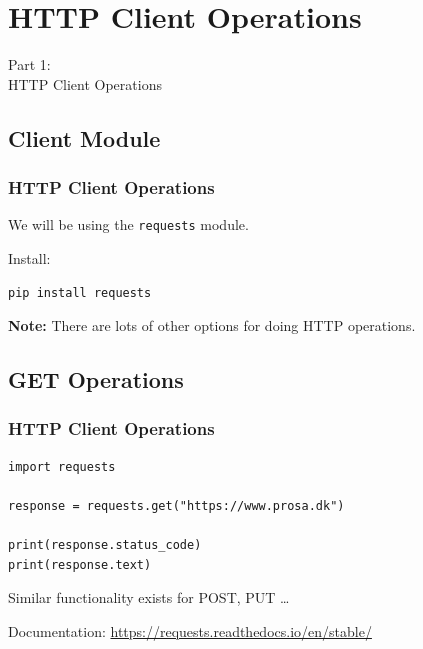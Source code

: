 \definecolor{http}{rgb}{\componentA, \componentB, \componentC}
\definecolor{xlsx}{rgb}{\componentB, \componentC, \componentA}
\definecolor{next}{rgb}{\componentC, \componentA, \componentB}
\definecolor{ex}{rgb}{  \componentA, \componentB, \componentC}


{
\renewcommand{\bgcolor}{http}

\section{HTTP Client Operations}
\begin{frame}
  \vspace{25mm}
  \begin{center}
    \Huge{Part 1:\\HTTP Client Operations}
  \end{center}
\end{frame}

\subsection{Client Module}
\begin{frame}[fragile]
  \frametitle{HTTP Client Operations }
  \vspace{3mm}
  We will be using the \texttt{requests} module.
  
  \vspace{5mm}
  Install:
  \begin{verbatim}
pip install requests
  \end{verbatim}
  
  \pause
  \vspace{5mm}
  \textbf{Note:} There are lots of other options for doing HTTP operations.
\end{frame}

\subsection{GET Operations}
\begin{frame}[fragile]
  \frametitle{HTTP Client Operations }
  \vspace{3mm}
  \begin{verbatim}
import requests

response = requests.get("https://www.prosa.dk")

print(response.status_code)
print(response.text)
  \end{verbatim}
  
  \pause
  \vspace{5mm}
  Similar functionality exists for POST, PUT \ldots
  
  \pause
  \vspace{5mm}
  Documentation: \url{https://requests.readthedocs.io/en/stable/}
\end{frame}

}


